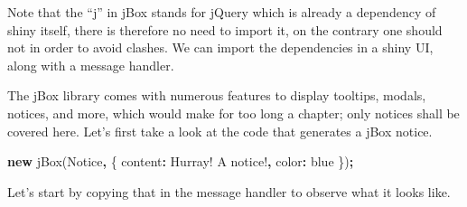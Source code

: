 \documentclass[
]{krantz}
\makeatletter
\newenvironment{Shaded}{\begin{snugshade}}{\end{snugshade}}
\newcommand{\DataTypeTok}[1]{\textcolor[rgb]{0.27,0.27,0.27}{#1}}
\newcommand{\KeywordTok}[1]{\textcolor[rgb]{0.27,0.27,0.27}{\textbf{#1}}}
\newcommand{\NormalTok}[1]{#1}
\newcommand{\OperatorTok}[1]{\textcolor[rgb]{0.43,0.43,0.43}{\textbf{#1}}}
\newcommand{\StringTok}[1]{\textcolor[rgb]{0.5,0.5,0.5}{#1}}
\newenvironment{kframe}{%
\medskip{}
\setlength{\fboxsep}{.8em}
 \def\at@end@of@kframe{}%
 \ifinner\ifhmode%
  \def\at@end@of@kframe{\end{minipage}}%
  \begin{minipage}{\columnwidth}%
 \fi\fi%
 \def\FrameCommand##1{\hskip\@totalleftmargin \hskip-\fboxsep
 \colorbox{shadecolor}{##1}\hskip-\fboxsep
     \hskip-\linewidth \hskip-\@totalleftmargin \hskip\columnwidth}%
 \MakeFramed {\advance\hsize-\width
   \@totalleftmargin\z@ \linewidth\hsize
   \@setminipage}}%
 {\par\unskip\endMakeFramed%
 \at@end@of@kframe}
\renewenvironment{Shaded}{\begin{kframe}}{\end{kframe}}
\makeatother
\begin{document}
Note that the ``j'' in jBox stands for jQuery which is already a dependency of shiny itself, there is therefore no need to import it, on the contrary one should not in order to avoid clashes. We can import the dependencies in a shiny UI, along with a message handler.

\begin{Shaded}
\end{Shaded}

The jBox library comes with numerous features to display tooltips, modals, notices, and more, which would make for too long a chapter; only notices shall be covered here. Let's first take a look at the code that generates a jBox notice.

\begin{Shaded}
\begin{Highlighting}[]
\KeywordTok{new}\NormalTok{ jBox(}\StringTok{\textquotesingle{}Notice\textquotesingle{}}\OperatorTok{,}\NormalTok{ \{}
  \DataTypeTok{content}\OperatorTok{:} \StringTok{\textquotesingle{}Hurray! A notice!\textquotesingle{}}\OperatorTok{,}
  \DataTypeTok{color}\OperatorTok{:} \StringTok{\textquotesingle{}blue\textquotesingle{}}
\NormalTok{\})}\OperatorTok{;}
\end{Highlighting}
\end{Shaded}

Let's start by copying that in the message handler to observe what it looks like.
\end{document}
